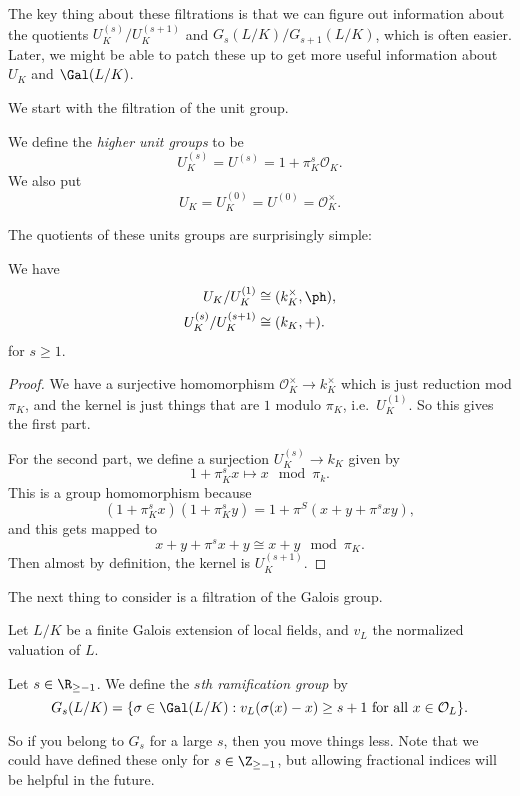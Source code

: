 \documentclass[a4paper]{article}
\begin{document}
The key thing about these filtrations is that we can figure out information about the quotients $U_K^{(s)}/U_K^{(s + 1)}$ and $G_s(L/K)/G_{s + 1}(L/K)$, which is often easier. Later, we might be able to patch these up to get more useful information about $U_K$ and $\Gal(L/K)$.

We start with the filtration of the unit group.

\begin{defi}
  We define the \emph{higher unit groups} to be
  \[
    U_K^{(s)} = U^{(s)} = 1 + \pi_K^s\mathcal{O}_K.
  \]
  We also put
  \[
    U_K = U_K^{(0)} = U^{(0)} = \mathcal{O}_K^\times.
  \]
\end{defi}

The quotients of these units groups are surprisingly simple:
\begin{prop}
  We have
  \begin{align*}
    U_K/U_K^{(1)} &\cong (k_K^\times, \ph),\\
    U_K^{(s)}/U_K^{(s + 1)} &\cong (k_K, +).
  \end{align*}
  for $s \geq 1$.
\end{prop}

\begin{proof}
  We have a surjective homomorphism $\mathcal{O}_K^\times \to k_K^\times$ which is just reduction mod $\pi_K$, and the kernel is just things that are $1$ modulo $\pi_K$, i.e.\ $U_K^{(1)}$. So this gives the first part.

  For the second part, we define a surjection $U_K^{(s)} \to k_K$ given by
  \[
    1 + \pi_K^s x \mapsto x \mod \pi_k.
  \]
  This is a group homomorphism because
  \[
    (1 + \pi_K^s x)(1 + \pi_K^s y) = 1 + \pi^S(x + y + \pi^s xy),
  \]
  and this gets mapped to
  \[
    x + y + \pi^s x + y \cong x + y \mod \pi_K.
  \]
  Then almost by definition, the kernel is $U_K^{(s + 1)}$.
\end{proof}

The next thing to consider is a filtration of the Galois group.
\begin{defi}
  Let $L/K$ be a finite Galois extension of local fields, and $v_L$ the normalized valuation of $L$.

  Let $s \in \R_{\geq -1}$. We define the \emph{$s$th ramification group} by
  \[
    G_s(L/K) = \{\sigma \in \Gal(L/K): v_L(\sigma(x) - x) \geq s + 1\text{ for all }x \in \mathcal{O}_L\}.
  \]
\end{defi}
So if you belong to $G_s$ for a large $s$, then you move things less. Note that we could have defined these only for $s \in \Z_{\geq -1}$, but allowing fractional indices will be helpful in the future.
\end{document}
